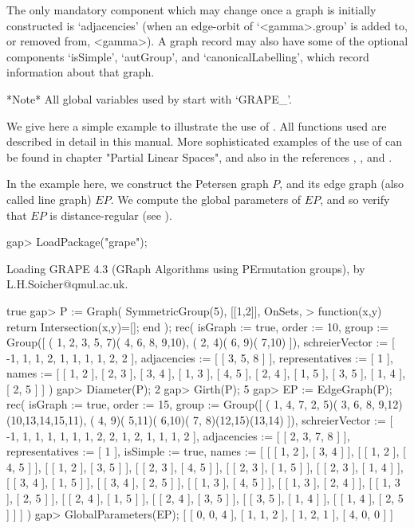 The only mandatory component which may change once a graph is initially
constructed is `adjacencies' (when an edge-orbit of `<gamma>.group' is
added to, or removed from, <gamma>). A graph record may also have some
of the optional components `isSimple', `autGroup', and
`canonicalLabelling', which record information about that graph.

*Note* All global variables used by {\GRAPE} start with `GRAPE\_'.


We give here a simple example to illustrate the use of {\GRAPE}. All
functions used are described in detail in this manual. More
sophisticated examples of the use of {\GRAPE} can be found in
chapter "Partial Linear Spaces", and also in the references \cite{Cam99},
\cite{CSS99}, \cite{HL99} and \cite{Soi06}.

In the example here, we construct the Petersen graph $P$, and its edge
graph (also called line graph) $EP$. We compute the global parameters
of $EP$, and so verify that $EP$ is distance-regular (see \cite{BCN89}).

\beginexample
gap> LoadPackage("grape");

Loading  GRAPE 4.3  (GRaph Algorithms using PErmutation groups),
by L.H.Soicher@qmul.ac.uk.

true
gap> P := Graph( SymmetricGroup(5), [[1,2]], OnSets,
>             function(x,y) return Intersection(x,y)=[]; end );
rec( isGraph := true, order := 10, 
  group := Group([ ( 1, 2, 3, 5, 7)( 4, 6, 8, 9,10), ( 2, 4)( 6, 9)( 7,10) ]),
  schreierVector := [ -1, 1, 1, 2, 1, 1, 1, 1, 2, 2 ], 
  adjacencies := [ [ 3, 5, 8 ] ], representatives := [ 1 ], 
  names := [ [ 1, 2 ], [ 2, 3 ], [ 3, 4 ], [ 1, 3 ], [ 4, 5 ], [ 2, 4 ], 
      [ 1, 5 ], [ 3, 5 ], [ 1, 4 ], [ 2, 5 ] ] )
gap> Diameter(P);
2
gap> Girth(P);
5
gap> EP := EdgeGraph(P);
rec( isGraph := true, order := 15, 
  group := Group([ ( 1, 4, 7, 2, 5)( 3, 6, 8, 9,12)(10,13,14,15,11), 
      ( 4, 9)( 5,11)( 6,10)( 7, 8)(12,15)(13,14) ]), 
  schreierVector := [ -1, 1, 1, 1, 1, 1, 1, 2, 2, 1, 2, 1, 1, 1, 2 ], 
  adjacencies := [ [ 2, 3, 7, 8 ] ], representatives := [ 1 ], 
  isSimple := true, 
  names := [ [ [ 1, 2 ], [ 3, 4 ] ], [ [ 1, 2 ], [ 4, 5 ] ], 
      [ [ 1, 2 ], [ 3, 5 ] ], [ [ 2, 3 ], [ 4, 5 ] ], [ [ 2, 3 ], [ 1, 5 ] ], 
      [ [ 2, 3 ], [ 1, 4 ] ], [ [ 3, 4 ], [ 1, 5 ] ], [ [ 3, 4 ], [ 2, 5 ] ], 
      [ [ 1, 3 ], [ 4, 5 ] ], [ [ 1, 3 ], [ 2, 4 ] ], [ [ 1, 3 ], [ 2, 5 ] ], 
      [ [ 2, 4 ], [ 1, 5 ] ], [ [ 2, 4 ], [ 3, 5 ] ], [ [ 3, 5 ], [ 1, 4 ] ], 
      [ [ 1, 4 ], [ 2, 5 ] ] ] )
gap> GlobalParameters(EP);
[ [ 0, 0, 4 ], [ 1, 1, 2 ], [ 1, 2, 1 ], [ 4, 0, 0 ] ]
\endexample
